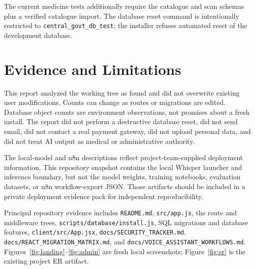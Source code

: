 \documentclass[12pt,a4paper,oneside]{report}
\newcommand{\code}[1]{\texttt{#1}}
\begin{document}
The current medicine tests additionally require the catalogue and scan schemas plus a verified
catalogue import. The database reset command is intentionally restricted to
\code{central\_govt\_db\_test}; the installer refuses automated reset of the development database.

\chapter{Evidence and Limitations}

This report analyzed the working tree as found and did not overwrite existing user modifications.
Counts can change as routes or migrations are edited. Database object counts are environment
observations, not promises about a fresh install. The report did not perform a destructive database
reset, did not send email, did not contact a real payment gateway, did not upload personal data,
and did not treat AI output as medical or administrative authority.

The local-model and n8n descriptions reflect project-team-supplied deployment information. This
repository snapshot contains the local Whisper launcher and inference boundary, but not the model
weights, training notebooks, evaluation datasets, or n8n workflow-export JSON. Those artifacts
should be included in a private deployment evidence pack for independent reproducibility.

Principal repository evidence includes \code{README.md}, \code{src/app.js}, the route and
middleware trees, \code{scripts/database/install.js}, SQL migrations and database features,
\code{client/src/App.jsx}, \code{docs/SECURITY\_TRACKER.md},
\code{docs/REACT\_MIGRATION\_MATRIX.md}, and
\code{docs/VOICE\_ASSISTANT\_WORKFLOWS.md}. Figures~\ref{fig:landing}--\ref{fig:admin} are fresh
local screenshots; Figure~\ref{fig:er} is the existing project ER artifact.
\end{document}
